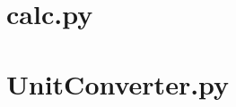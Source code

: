 \documentclass[10pt, a4paper]{article}%
\begin{document}
\clearpage
\section*{calc.py}


\section*{UnitConverter.py}

 
\end{document}
